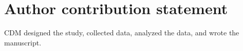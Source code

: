 \documentclass[12pt, oneside]{article}
\begin{document}
\section*{Author contribution statement}
CDM designed the study, collected data, analyzed the data, and wrote the manuscript.

\clearpage





\clearpage








\clearpage

\end{document}
